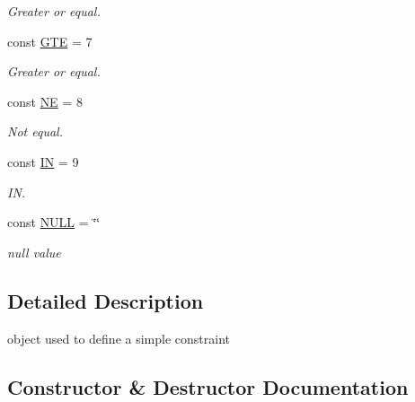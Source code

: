 \begin{DoxyCompactItemize}
\begin{DoxyCompactList}\small\item\em Greater or equal. \end{DoxyCompactList}\item 
\hypertarget{classconstraint_a7271610e95f862dfcbfeebdc22c1be05}{}const \hyperlink{classconstraint_a7271610e95f862dfcbfeebdc22c1be05}{G\+T\+E} = 7\label{classconstraint_a7271610e95f862dfcbfeebdc22c1be05}

\begin{DoxyCompactList}\small\item\em Greater or equal. \end{DoxyCompactList}\item 
\hypertarget{classconstraint_a7e396087ac8d1599de8c52809d56f601}{}const \hyperlink{classconstraint_a7e396087ac8d1599de8c52809d56f601}{N\+E} = 8\label{classconstraint_a7e396087ac8d1599de8c52809d56f601}

\begin{DoxyCompactList}\small\item\em Not equal. \end{DoxyCompactList}\item 
\hypertarget{classconstraint_afbfe29cd59c13b70e9a1a73815ae785d}{}const \hyperlink{classconstraint_afbfe29cd59c13b70e9a1a73815ae785d}{I\+N} = 9\label{classconstraint_afbfe29cd59c13b70e9a1a73815ae785d}

\begin{DoxyCompactList}\small\item\em I\+N. \end{DoxyCompactList}\item 
\hypertarget{classconstraint_a1d309686038b8d79ba68ce1afeb76c97}{}const \hyperlink{classconstraint_a1d309686038b8d79ba68ce1afeb76c97}{N\+U\+L\+L} = \char`\"{}\textquotesingle{}\textquotesingle{}\char`\"{}\label{classconstraint_a1d309686038b8d79ba68ce1afeb76c97}

\begin{DoxyCompactList}\small\item\em null value \end{DoxyCompactList}\end{DoxyCompactItemize}


\subsection{Detailed Description}
object used to define a simple constraint 

\subsection{Constructor \& Destructor Documentation}
\hypertarget{classconstraint_a9e4321b5cf73af8119e6ecaac6069bbc}{}
